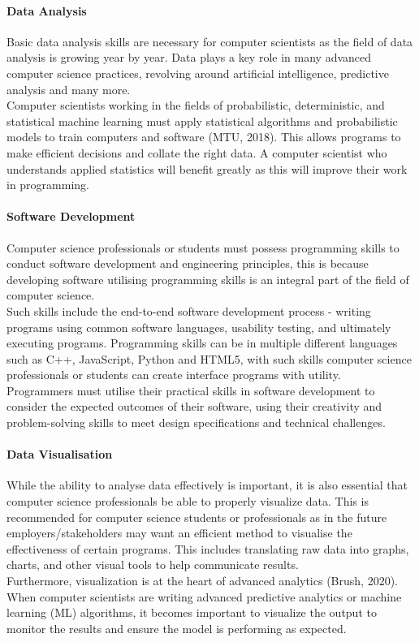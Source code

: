 \documentclass[a4paper, 11pt]{report}
\begin{document}
	\paragraph {Data Analysis} Basic data analysis skills are necessary for computer scientists as the field of data analysis is growing year by year. Data plays a key role in many advanced computer science practices, revolving around artificial intelligence, predictive analysis and many more.
	\\Computer scientists working in the fields of probabilistic, deterministic, and statistical machine learning must apply statistical algorithms and probabilistic models to train computers and software (MTU, 2018). This allows programs to make efficient decisions and collate the right data. A computer scientist who understands applied statistics will benefit greatly as this will improve their work in programming.

	\paragraph {Software Development} Computer science professionals or students must possess programming skills to conduct software development and engineering principles, this is because developing software utilising programming skills is an integral part of the field of computer science.
	\\Such skills include the end-to-end software development process - writing programs using common software languages, usability testing, and ultimately executing programs. Programming skills can be in multiple different languages such as C++, JavaScript, Python and HTML5, with such skills computer science professionals or students can create interface programs with utility.
	\\Programmers must utilise their practical skills in software development to consider the expected outcomes of their software, using their creativity and problem-solving skills to meet design specifications and technical challenges.

	\paragraph {Data Visualisation} While the ability to analyse data effectively is important, it is also essential that computer science professionals be able to properly visualize data. This is recommended for computer science students or professionals as in the future employers/stakeholders may want an efficient method to visualise the effectiveness of certain programs. This includes translating raw data into graphs, charts, and other visual tools to help communicate results.
	\\ Furthermore, visualization is at the heart of advanced analytics (Brush, 2020). When computer scientists are writing advanced predictive analytics or machine learning (ML) algorithms, it becomes important to visualize the output to monitor the results and ensure the model is performing as expected.
\end{document}
